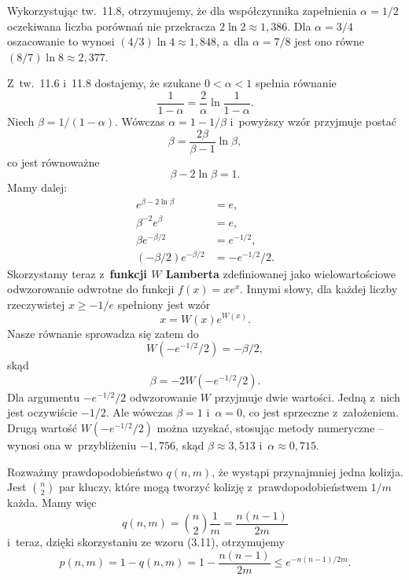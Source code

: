 \exercise %
Wykorzystując tw.\ 11.8, otrzymujemy, że dla współczynnika zapełnienia $\alpha=1/2$ oczekiwana liczba porównań nie przekracza $2\ln2\approx1{,}386$.
Dla $\alpha=3/4$ oszacowanie to wynosi $(4/3)\ln4\approx1{,}848$, a~dla $\alpha=7/8$ jest ono równe $(8/7)\ln8\approx2{,}377$.

\exercise %
Z~tw.\ 11.6 i~11.8 dostajemy, że szukane $0<\alpha<1$ spełnia równanie
\[
	\frac{1}{1-\alpha} = \frac{2}{\alpha}\ln\frac{1}{1-\alpha}.
\]
Niech $\beta=1/(1-\alpha)$.
Wówczas $\alpha=1-1/\beta$ i~powyższy wzór przyjmuje postać
\[
	\beta = \frac{2\beta}{\beta-1}\ln\beta,
\]
co jest równoważne
\[
	\beta-2\ln\beta = 1.
\]
Mamy dalej:
\begin{align*}
	e^{\beta-2\ln\beta} &= e, \\
	\beta^{-2}e^\beta &= e, \\
	\beta e^{-\beta/2} &= e^{-1/2}, \\
	(-\beta/2)e^{-\beta/2} &= -e^{-1/2}\!/2.
\end{align*}
Skorzystamy teraz z~\textbf{funkcji $W$ Lamberta} \cite{lambertwfunction} zdefiniowanej jako wielowartościowe odwzorowanie odwrotne do funkcji $f(x)=xe^x$.
Innymi słowy, dla każdej liczby rzeczywistej $x\ge-1/e$ spełniony jest wzór
\[
	x = W(x)e^{W(x)}.
\]
Nasze równanie sprowadza się zatem do
\[
	W(-e^{-1/2}\!/2) = -\beta/2,
\]
skąd
\[
	\beta = -2W(-e^{-1/2}\!/2).
\]
Dla argumentu $-e^{-1/2}\!/2$ odwzorowanie $W$ przyjmuje dwie wartości.
Jedną z~nich jest oczywiście $-1/2$.
Ale wówczas $\beta=1$ i~$\alpha=0$, co jest sprzeczne z~założeniem.
Drugą wartość $W(-e^{-1/2}\!/2)$ można uzyskać, stosując metody numeryczne -- wynosi ona w~przybliżeniu $-1{,}756$, skąd $\beta\approx3{,}513$ i~$\alpha\approx0{,}715$.


\exercise %

\noindent Rozważmy prawdopodobieństwo $q(n,m)$, że wystąpi przynajmniej jedna kolizja.
Jest $\binom{n}{2}$ par kluczy, które mogą tworzyć kolizję z~prawdopodobieństwem $1/m$ każda.
Mamy więc
\[
	q(n,m) = \binom{n}{2}\frac{1}{m} = \frac{n(n-1)}{2m}
\]
i~teraz, dzięki skorzystaniu ze wzoru (3.11), otrzymujemy
\[
	p(n,m) = 1-q(n,m) = 1-\frac{n(n-1)}{2m} \le e^{-n(n-1)/2m}.
\]

